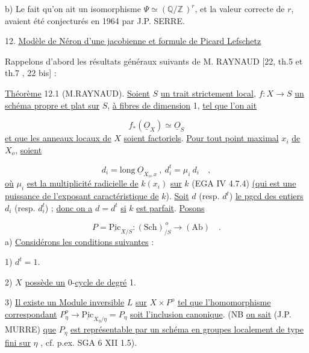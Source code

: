 b) Le fait qu'on ait un isomorphisme $\Psi \simeq (\mathbb{Q}/\mathbb{Z}\,)^r$, et la valeur correcte de $r$, avaient été conjecturés en 1964 par J.P. SERRE.




12. \underline{Modèle de Néron d'une jacobienne et formule de Picard Lefschetz}

Rappelons d'abord les résultats généraux suivants de M. RAYNAUD [22, th.5 et th.7 , 22 bis] :

\underline{Théorème} 12.1 (M.RAYNAUD). \underline{Soient} $S$ \underline{un trait strictement local}, $f:X \to S$ \underline{un schéma propre et plat sur} $S$, \underline{à fibres de dimension} 1, \underline{tel que l'on ait}

\begin{equation}\tag{12.1.1}
f_*(\underline{O}_X) \simeq \underline{O}_S
\end{equation}
\underline{et que les anneaux locaux de} $X$ \underline{soient factoriels}. \underline{Pour tout point maximal} $x_i$ \underline{de} $X_o$, \underline{soient}

\begin{equation}\tag{12.1.2}
d_i = \mathrm{long}\ \underline{O}_{X_o,x} \ , \ d_i^t = \mu_i \ d_i \quad ,
\end{equation}
\underline{où} $\mu_i$ \underline{est la multiplicité radicielle de} $k(x_i)$ \underline{sur} $k$ (EGA IV 4.7.4) \underline{(qui est une puissance de l'exposant caractéristique de} $k$). \underline{Soit} $d$ (resp. $d^t$) \underline{le pgcd des entiers} $d_i$ (resp. $d_i^t$) ; \underline{donc on a} $d = d^t$ \underline{si} $k$ \underline{est parfait}. \underline{Posons}

\begin{equation}\tag{12.1.3}
P = \underline{\mathrm{Pic}}_{X/S} : (\mathrm{Sch})_{/S}^{\,o} \longrightarrow (\mathrm{Ab}) \quad .
\end{equation}
a) \underline{Considérons les conditions suivantes} :

1) $d^t=1$.

2) $X$ \underline{possède un} $0$-\underline{cycle de degré} 1.

3) \underline{Il existe un Module inversible} $L$ \underline{sur} $X \times P^o$ \underline{tel que l'homomorphisme correspondant} $P^o_\eta \longrightarrow \underline{\mathrm{Pic}}_{X_\eta/\eta} = P_\eta$ \underline{soit l'inclusion canonique}. (NB \underline{on sait} (J.P. MURRE) \underline{que} $P_\eta$ \underline{est représentable par un schéma en groupes localement de type fini sur} $\eta$ , cf. p.ex. SGA 6 XII 1.5).


